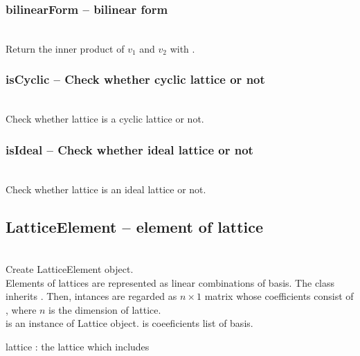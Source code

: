   \subsubsection{bilinearForm -- bilinear form}
  \\
  \spacing
  \quad Return the inner product of $v_1$ and $v_2$ with . \\
  \spacing
%
  \subsubsection{isCyclic -- Check whether cyclic lattice or not}
  \\
  \spacing
  \quad Check whether  lattice is a cyclic lattice or not.
  \spacing
  \quad 
%
  \subsubsection{isIdeal -- Check whether ideal lattice or not}
  \\
  \spacing
  \quad Check whether  lattice is an ideal lattice or not.
  \spacing
\C
  \subsection{LatticeElement -- element of lattice}
  \initialize
  \\
  \spacing
  \quad Create LatticeElement object. \\
  \spacing
  \quad Elements of lattices are represented as linear combinations of basis.
  The class inherits . Then, intances are regarded as $n \times 1$ matrix whose coefficients consist of , where $n$ is the dimension of lattice.\\
  \spacing
  \quad {} is an instance of Lattice object.  is coeeficients list of basis.
  \begin{at}
    \item[lattice]: the lattice which includes 
  \end{at}
\C
  \method

